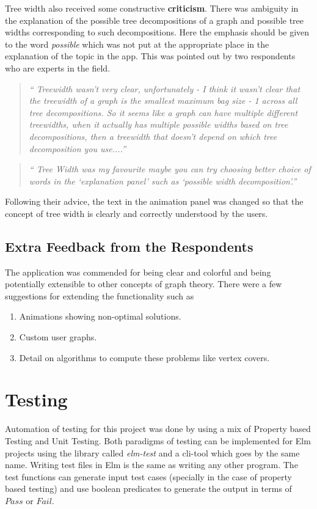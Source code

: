 Tree width also received some constructive \textbf{criticism}. There was
ambiguity in the explanation of the possible tree decompositions of a graph and
possible tree widths corresponding to such decompositions. Here the emphasis
should be given to the word \emph{possible} which was not put at the appropriate
place in the explanation of the topic in the app. This was pointed out
by two respondents who are experts in the field. 

\begin{quote}
\emph{``
Treewidth wasn't very clear, unfortunately - I think it wasn't clear that the
treewidth of a graph is the smallest maximum bag size - 1 across all tree
decompositions. So it seems like a graph can have multiple different
treewidths, when it actually has multiple possible widths based on tree
decompositions, then a treewidth that doesn't depend on which tree
decomposition you use....''}
\end{quote}
\begin{quote}
\emph{``
Tree Width was my favourite maybe
you can try choosing better choice of words in the `explanation panel'  such as
`possible width decomposition'.''}
\end{quote}

Following their advice, the text in the animation panel was changed so that
the concept of tree width is clearly and correctly understood by the users.


\subsection{Extra Feedback from the Respondents}
The application was commended for being clear and colorful and being potentially
extensible to other concepts of graph theory. There were a few suggestions
for extending the functionality such as 
\begin{enumerate}
\item Animations showing non-optimal solutions.
\item Custom user graphs.
\item Detail on algorithms to compute these problems like vertex covers.
\end{enumerate}



\section{Testing}
Automation of testing for this project was done by using a mix of Property
based Testing and Unit Testing. Both paradigms of testing can be implemented
for Elm projects using the library called \emph{elm-test} and a cli-tool which
goes by the same name. Writing test files in Elm is the same as writing any
other program. The test functions can generate input test cases (specially in
the case of property based testing) and use boolean predicates to generate the
output in terms of $Pass$ or $Fail$.

